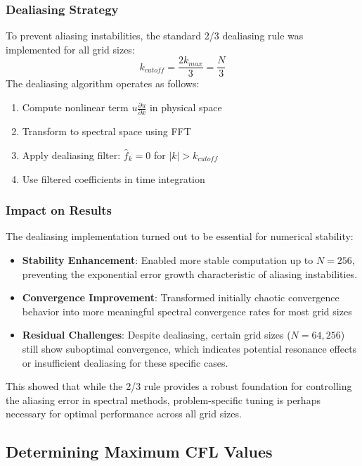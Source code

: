 \subsubsection{Dealiasing Strategy}
To prevent aliasing instabilities, the standard 2/3 dealiasing rule was implemented for all grid sizes:
\begin{equation}
	k_{cutoff} = \frac{2k_{max}}{3} = \frac{N}{3}
\end{equation}
The dealiasing algorithm operates as follows:
\begin{enumerate}
	\item Compute nonlinear term $u\frac{\partial u}{\partial x}$ in physical space
	\item Transform to spectral space using FFT
	\item Apply dealiasing filter: $\hat{f}_k = 0$ for $|k| > k_{cutoff}$
	\item Use filtered coefficients in time integration
\end{enumerate}

\subsubsection{Impact on Results}
The dealiasing implementation turned out to be essential for numerical stability:

\begin{itemize}
	\item \textbf{Stability Enhancement}: Enabled more stable computation up to $N = 256$, preventing the exponential error growth characteristic of aliasing instabilities.
	\item \textbf{Convergence Improvement}: Transformed initially chaotic convergence behavior into more meaningful spectral convergence rates for most grid sizes
	\item \textbf{Residual Challenges}: Despite dealiasing, certain grid sizes ($N = 64, 256$) still show suboptimal convergence, which indicates potential resonance effects or insufficient dealiasing for these specific cases.
\end{itemize}
%
This showed that while the 2/3 rule provides a robust foundation for controlling the aliasing error in spectral methods, problem-specific tuning is perhaps  necessary for optimal performance across all grid sizes.

\subsection{Determining Maximum CFL Values}

